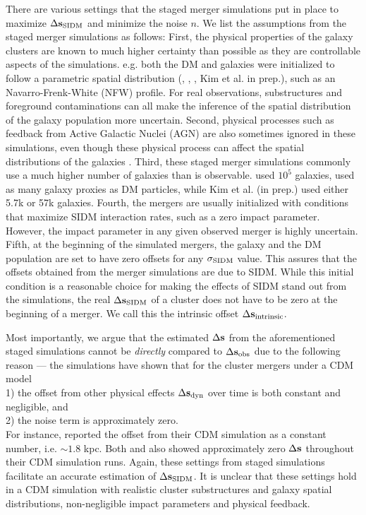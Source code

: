 There are various settings that the staged merger simulations put in place to maximize
$\Delta {\bf s}_{{\rm SIDM}}$ and minimize the noise $n$. 
We list the assumptions from the staged merger simulations as follows: 
First, the physical properties of the galaxy
clusters are known to much higher certainty than possible as they are
controllable aspects of the simulations. e.g. both the DM and 
galaxies were initialized to follow a parametric spatial 
distribution   
(\citealt{Randall2008d}, \citealt{Kahlhoefer14}, \citealt{Robertson2016}, Kim
et al. in prep.), 
such as an Navarro-Frenk-White (NFW) profile. For real observations,
substructures and foreground
contaminations can all make the inference of the spatial distribution 
of the galaxy population more uncertain. 
Second, physical processes such as feedback from Active
Galactic Nuclei (AGN) are also sometimes ignored in these simulations, 
even though these physical process can affect the spatial distributions of the
galaxies \citep{Cui2015}.  
Third, these staged merger simulations commonly use a much higher number of 
galaxies than is observable. \cite{Randall2008d} used
$10^5$ galaxies, \cite{Kahlhoefer14} used as many galaxy proxies as DM particles, 
while Kim et al. (in prep.) used either 5.7k or 57k galaxies. 
Fourth, the mergers are usually initialized with conditions that maximize SIDM
interaction rates, such as a zero impact parameter. However, the impact
parameter in any given observed merger is highly uncertain. 
Fifth, at the beginning of the simulated mergers, the galaxy and the DM
population are set to have zero offsets for any $\sigma_{\rm SIDM}$ value. 
This assures that the offsets obtained from the merger simulations are due to SIDM. 
While this initial condition 
is a reasonable choice for making the effects of SIDM stand out from the simulations, 
the real $\Delta {\bf s}_{{\rm SIDM}}$ of a cluster does not have to be zero at the 
beginning of a merger. We call this the intrinsic offset $\Delta {\bf s}_{\rm
intrinsic}$.

Most importantly, we argue that the estimated $\Delta {\bf s}$ 
from the aforementioned staged simulations cannot be
{\it directly}
compared to $\Delta {\bf s}_{\rm obs}$ due to the following reason --- 
the simulations have shown that for the cluster mergers under a CDM model
\\
1) the offset from other physical effects $\Delta {\bf s}_{\rm dyn}$ over time 
is both constant and negligible, 
and \\ 
2) the noise term is approximately zero.\\ 
For instance, \cite{Randall2008d} reported the offset from their CDM simulation 
as a constant number, i.e. $\sim 1.8$ kpc. 
Both \cite{Robertson2016} and
\cite{Kahlhoefer14} also showed approximately zero $\Delta {\bf s}$ throughout their CDM 
simulation runs.   
Again, these settings from staged simulations facilitate an accurate estimation
of $\Delta {\bf s}_{\rm SIDM}$. It is unclear that these settings hold in a CDM simulation
with realistic cluster substructures and galaxy spatial distributions, 
non-negligible impact parameters and physical feedback.

